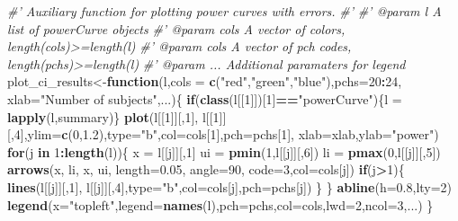 \documentclass[]{article}
\newenvironment{Shaded}{\begin{snugshade}}{\end{snugshade}}
\newcommand{\KeywordTok}[1]{\textcolor[rgb]{0.13,0.29,0.53}{\textbf{#1}}}
\newcommand{\DataTypeTok}[1]{\textcolor[rgb]{0.13,0.29,0.53}{#1}}
\newcommand{\DecValTok}[1]{\textcolor[rgb]{0.00,0.00,0.81}{#1}}
\newcommand{\FloatTok}[1]{\textcolor[rgb]{0.00,0.00,0.81}{#1}}
\newcommand{\StringTok}[1]{\textcolor[rgb]{0.31,0.60,0.02}{#1}}
\newcommand{\CommentTok}[1]{\textcolor[rgb]{0.56,0.35,0.01}{\textit{#1}}}
\newcommand{\ControlFlowTok}[1]{\textcolor[rgb]{0.13,0.29,0.53}{\textbf{#1}}}
\newcommand{\OperatorTok}[1]{\textcolor[rgb]{0.81,0.36,0.00}{\textbf{#1}}}
\newcommand{\NormalTok}[1]{#1}
\begin{document}
\begin{Shaded}
\begin{Highlighting}[]
\CommentTok{#' Auxiliary function for plotting power curves with errors.}
\CommentTok{#' }
\CommentTok{#'  @param l A list of powerCurve objects}
\CommentTok{#'  @param cols A vector of colors, length(cols)>=length(l)}
\CommentTok{#'  @param cols A vector of pch codes, length(pchs)>=length(l)}
\CommentTok{#'  @param ... Additional paramaters for legend}
\NormalTok{plot_ci_results<-}\ControlFlowTok{function}\NormalTok{(l,}\DataTypeTok{cols =} \KeywordTok{c}\NormalTok{(}\StringTok{"red"}\NormalTok{,}\StringTok{"green"}\NormalTok{,}\StringTok{"blue"}\NormalTok{),}\DataTypeTok{pchs=}\DecValTok{20}\OperatorTok{:}\DecValTok{24}\NormalTok{,}
                          \DataTypeTok{xlab=}\StringTok{"Number of subjects"}\NormalTok{,...)\{}
  \ControlFlowTok{if}\NormalTok{(}\KeywordTok{class}\NormalTok{(l[[}\DecValTok{1}\NormalTok{]])[}\DecValTok{1}\NormalTok{]}\OperatorTok{==}\StringTok{"powerCurve"}\NormalTok{)\{l =}\StringTok{ }\KeywordTok{lapply}\NormalTok{(l,summary)\}}
  \KeywordTok{plot}\NormalTok{(l[[}\DecValTok{1}\NormalTok{]][,}\DecValTok{1}\NormalTok{], l[[}\DecValTok{1}\NormalTok{]][,}\DecValTok{4}\NormalTok{],}\DataTypeTok{ylim=}\KeywordTok{c}\NormalTok{(}\DecValTok{0}\NormalTok{,}\FloatTok{1.2}\NormalTok{),}\DataTypeTok{type=}\StringTok{"b"}\NormalTok{,}\DataTypeTok{col=}\NormalTok{cols[}\DecValTok{1}\NormalTok{],}\DataTypeTok{pch=}\NormalTok{pchs[}\DecValTok{1}\NormalTok{],}
       \DataTypeTok{xlab=}\NormalTok{xlab,}\DataTypeTok{ylab=}\StringTok{"power"}\NormalTok{)}
  \ControlFlowTok{for}\NormalTok{(j }\ControlFlowTok{in} \DecValTok{1}\OperatorTok{:}\KeywordTok{length}\NormalTok{(l))\{}
\NormalTok{    x =}\StringTok{ }\NormalTok{l[[j]][,}\DecValTok{1}\NormalTok{]}
\NormalTok{    ui =}\StringTok{ }\KeywordTok{pmin}\NormalTok{(}\DecValTok{1}\NormalTok{,l[[j]][,}\DecValTok{6}\NormalTok{])}
\NormalTok{    li =}\StringTok{ }\KeywordTok{pmax}\NormalTok{(}\DecValTok{0}\NormalTok{,l[[j]][,}\DecValTok{5}\NormalTok{])}
    \KeywordTok{arrows}\NormalTok{(x, li, x, ui, }\DataTypeTok{length=}\FloatTok{0.05}\NormalTok{, }\DataTypeTok{angle=}\DecValTok{90}\NormalTok{, }\DataTypeTok{code=}\DecValTok{3}\NormalTok{,}\DataTypeTok{col=}\NormalTok{cols[j])  }
    \ControlFlowTok{if}\NormalTok{(j}\OperatorTok{>}\DecValTok{1}\NormalTok{)\{}
      \KeywordTok{lines}\NormalTok{(l[[j]][,}\DecValTok{1}\NormalTok{], l[[j]][,}\DecValTok{4}\NormalTok{],}\DataTypeTok{type=}\StringTok{"b"}\NormalTok{,}\DataTypeTok{col=}\NormalTok{cols[j],}\DataTypeTok{pch=}\NormalTok{pchs[j])}
\NormalTok{    \}}
\NormalTok{  \}}
  \KeywordTok{abline}\NormalTok{(}\DataTypeTok{h=}\FloatTok{0.8}\NormalTok{,}\DataTypeTok{lty=}\DecValTok{2}\NormalTok{)}
  \KeywordTok{legend}\NormalTok{(}\DataTypeTok{x=}\StringTok{"topleft"}\NormalTok{,}\DataTypeTok{legend=}\KeywordTok{names}\NormalTok{(l),}\DataTypeTok{pch=}\NormalTok{pchs,}\DataTypeTok{col=}\NormalTok{cols,}\DataTypeTok{lwd=}\DecValTok{2}\NormalTok{,}\DataTypeTok{ncol=}\DecValTok{3}\NormalTok{,...)}
\NormalTok{\}}
\end{Highlighting}
\end{Shaded}
\end{document}
